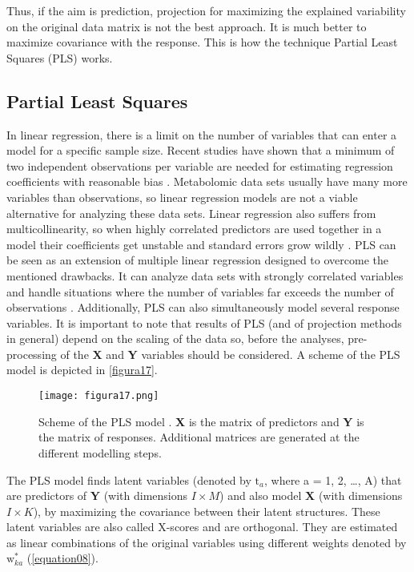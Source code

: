 Thus, if the aim is prediction, projection for maximizing the explained variability on the original data matrix is not the best approach. It is much better to maximize covariance with the response. This is how the technique Partial Least Squares (PLS) works.

\subsection{Partial Least Squares}
In linear regression, there is a limit on the number of variables that can enter a model for a specific sample size. Recent studies have shown that a minimum of two independent observations per variable are needed for estimating regression coefficients with reasonable bias \parencite{austin2015number}. Metabolomic data sets usually have many more variables than observations, so linear regression models are not a viable alternative for analyzing these data sets. Linear regression also suffers from multicollinearity, so when highly correlated predictors are used together in a model their coefficients get unstable and standard errors grow wildly \parencite{alin2010multicollinearity}. PLS can be seen as an extension of multiple linear regression designed to overcome the mentioned drawbacks. It can analyze data sets with strongly correlated variables and handle situations where the number of variables far exceeds the number of observations \parencite{wold2001pls}. Additionally, PLS can also simultaneously model several response variables. It is important to note that results of PLS (and of projection methods in general) depend on the scaling of the data so, before the analyses, pre-processing of the \textbf{X} and \textbf{Y} variables should be considered.
A scheme of the PLS model is depicted in \autoref{figura17}.

\begin{figure}[hbtp]
	\centering
\texttt{[image: figura17.png]}
\caption[Scheme of the PLS model]{Scheme of the PLS model \parencite{wold2001pls}. \textbf{X} is the matrix of predictors and \textbf{Y} is the matrix of responses. Additional matrices are generated at the different modelling steps.}
\label{figura17}
\end{figure}

The PLS model finds latent variables (denoted by $\text{t}_a$, where a = 1, 2, \dots, A) that are predictors of \textbf{Y} (with dimensions $I \times M$) and also model \textbf{X} (with dimensions $I \times K$), by maximizing the covariance between their latent structures. These latent variables are also called X-scores and are orthogonal. They are estimated as linear combinations of the original variables using different weights denoted by $\text{w}^*_{ka}$ (\autoref{equation08}). 

